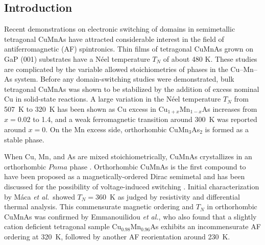 \documentclass[10pt,doublespacing,edeposit]{uiucthesis2020}
\begin{document}
\begin{mainmatter}
\fi

\section{Introduction} 

Recent demonstrations on electronic switching of domains in  semimetallic tetragonal CuMnAs have attracted considerable interest in the field of antiferromagnetic (AF) spintronics.\cite{Wadley2016,Grzybowski2017,Wadley2018,Matalla-Wagner2019} Thin films of tetragonal CuMnAs grown on GaP (001) substrates have a N\'eel temperature $T_N$ of about 480 K.\cite{Wadley2015,Hills2015} 
These studies are complicated by the variable allowed stoichiometries of  phases in the Cu--Mn--As system.
Before any domain-switching studies were demonstrated, bulk tetragonal CuMnAs was shown to be 
stabilized by the addition of excess nominal Cu in solid-state reactions.\cite{Uhlirova2015} 
A large variation in the N\'{e}el temperature $T_N$ from 507~K to 320~K has been shown as Cu excess in Cu$_{1+x}$Mn$_{1-x}$As increases from $x = 0.02$ to 1.4,\cite{Uhlirova2019} and a weak ferromagnetic transition around 300~K was reported around $x=0$.\cite{Nateprov2011}
On the Mn excess side, orthorhombic CuMn$_3$As$_2$ is formed as a stable phase.\cite{Uhlirova2015}
 
When Cu, Mn, and As are mixed stoichiometrically, CuMnAs crystallizes in an orthorhombic $Pnma$ phase \cite{MacA2012}.
Orthorhombic CuMnAs is the first compound to have been proposed as a magnetically-ordered Dirac semimetal \cite{Tang2016} and has been discussed for the possibility of voltage-induced switching \cite{Kim2018}.
Initial characterization by M\'{a}ca \emph{et al.}\ showed $T_N = 360$~K as judged by resistivity and differential thermal analysis.\cite{MacA2012} This commensurate magnetic ordering and $T_N$ in orthorhombic CuMnAs was confirmed by Emmanouilidou \emph{et al.}, who also found that a slightly cation deficient tetragonal sample Cu$_{0.98}$Mn$_{0.96}$As exhibits an incommensurate AF ordering at 320~K, followed by another AF reorientation around 230~K.\cite{emmanouilidou_magnetic_2017}


\end{mainmatter}
\end{document}
